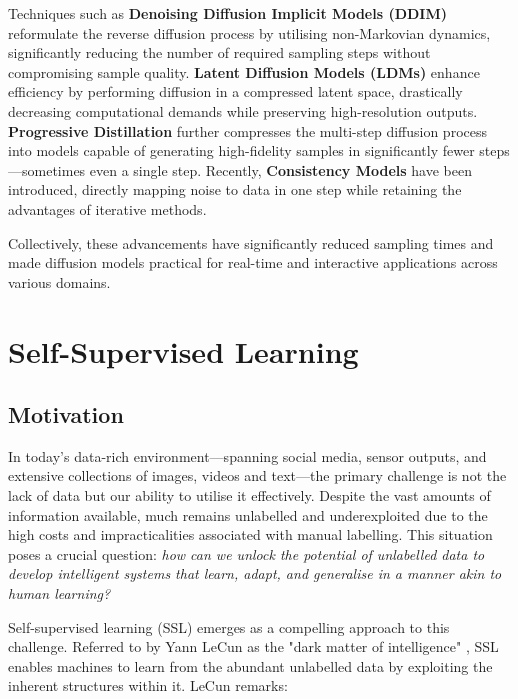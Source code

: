 Techniques such as \textbf{Denoising Diffusion Implicit Models (DDIM)} \cite{song2020denoising} reformulate the reverse diffusion process by utilising non-Markovian dynamics, significantly reducing the number of required sampling steps without compromising sample quality. \textbf{Latent Diffusion Models (LDMs)} \cite{rombach2022high} enhance efficiency by performing diffusion in a compressed latent space, drastically decreasing computational demands while preserving high-resolution outputs. \textbf{Progressive Distillation} \cite{salimans2022progressive} further compresses the multi-step diffusion process into models capable of generating high-fidelity samples in significantly fewer steps—sometimes even a single step. Recently, \textbf{Consistency Models} \cite{song2023consistency} have been introduced, directly mapping noise to data in one step while retaining the advantages of iterative methods.

Collectively, these advancements have significantly reduced sampling times and made diffusion models practical for real-time and interactive applications across various domains.

\section{Self-Supervised Learning}\label{intro:ssl}

\subsection{Motivation}


In today's data-rich environment—spanning social media, sensor outputs, and extensive collections of images, videos and text—the primary challenge is not the lack of data but our ability to utilise it effectively. Despite the vast amounts of information available, much remains unlabelled and underexploited due to the high costs and impracticalities associated with manual labelling. This situation poses a crucial question: \textit{how can we unlock the potential of unlabelled data to develop intelligent systems that learn, adapt, and generalise in a manner akin to human learning?}

Self-supervised learning (SSL) emerges as a compelling approach to this challenge. Referred to by Yann LeCun as the "dark matter of intelligence" \citep{lecun2021self}, SSL enables machines to learn from the abundant unlabelled data by exploiting the inherent structures within it. LeCun remarks:

